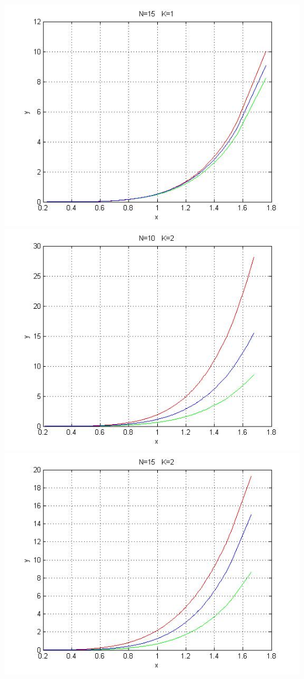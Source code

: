 \documentclass[a4paper, 11pt]{article}
\numberwithin{equation}{section}
\begin{document}
\includegraphics[width=1.0\textwidth]{../k1n15a6.jpg}\\
\includegraphics[width=1.0\textwidth]{../k2n10a6.jpg}\\
\includegraphics[width=1.0\textwidth]{../k2n15a6.jpg}\\
\newpage
\end{document}
